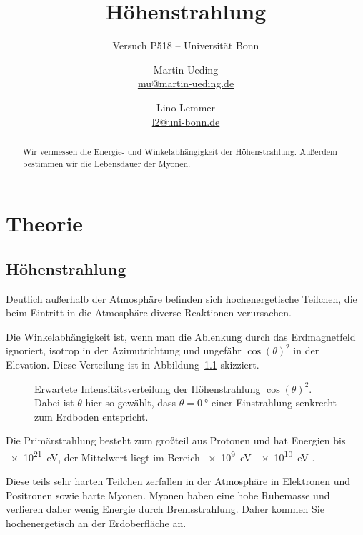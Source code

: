\documentclass[11pt, ngerman, fleqn, DIV=15, headinclude, BCOR=2cm]{scrreprt}
\title{Höhenstrahlung}
\subtitle{Versuch P518 -- Universität Bonn}
\author{
    Martin Ueding \\ \small{\href{mailto:mu@martin-ueding.de}{mu@martin-ueding.de}}
    \and
    Lino Lemmer \\
    \small{\href{mailto:l2@uni-bonn.de}{l2@uni-bonn.de}}
}
\date{\daterange{2014-07-02}{2014-07-03}}
\begin{document}
\maketitle

\begin{abstract}
    Wir vermessen die Energie- und Winkelabhängigkeit der Höhenstrahlung.
    Außerdem bestimmen wir die Lebensdauer der Myonen.
\end{abstract}

\tableofcontents

\chapter{Theorie}

\section{Höhenstrahlung}

Deutlich außerhalb der Atmosphäre befinden sich hochenergetische Teilchen, die
beim Eintritt in die Atmosphäre diverse Reaktionen verursachen. 

Die Winkelabhängigkeit ist, wenn man die Ablenkung durch das Erdmagnetfeld
ignoriert, isotrop in der Azimutrichtung und ungefähr $\cos(\theta)^2$ in der
Elevation. Diese Verteilung ist in Abbildung~\ref{fig:cos2} skizziert.

\begin{figure}[htbp]
    \centering
    \caption{%
        Erwartete Intensitätsverteilung der Höhenstrahlung $\cos(\theta)^2$.
        Dabei ist $\theta$ hier so gewählt, dass $\theta = \SI{0}{\degree}$
        einer Einstrahlung senkrecht zum Erdboden entspricht.
    }
    \label{fig:cos2}
\end{figure}

Die Primärstrahlung besteht zum großteil aus Protonen und hat Energien bis
\SI{e21}{\electronvolt}, der Mittelwert liegt im Bereich
\SIrange{e9}{e10}{\electronvolt} \parencite[983]{meschede-gerthsen_24}.

Diese teils sehr harten Teilchen zerfallen in der Atmosphäre in Elektronen und
Positronen sowie harte Myonen. Myonen haben eine hohe Ruhemasse und verlieren
daher wenig Energie durch Bremsstrahlung. Daher kommen Sie hochenergetisch an
der Erdoberfläche an. \parencite[984]{meschede-gerthsen_24}
\end{document}
